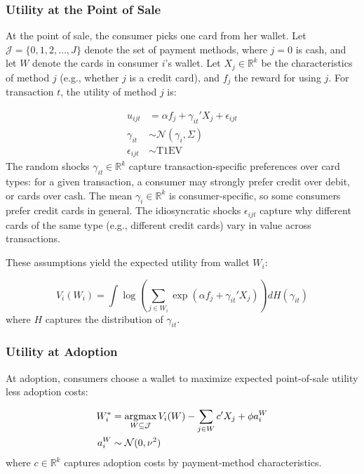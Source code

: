 \documentclass[main.tex]{subfiles}
\begin{document}
\subsubsection{Utility at the Point of Sale}

At the point of sale, the consumer picks one card from her wallet. Let $\mathcal{J} = \{0, 1, 2, \ldots, J\}$ denote the set of payment methods, where $j = 0$ is cash, and let $W$ denote the cards in consumer $i$'s wallet. Let $X_j \in \mathbb{R}^k$ be the characteristics of method $j$ (e.g., whether $j$ is a credit card), and $f_j$ the reward for using $j$.
For transaction $t$, the utility of method $j$ is:

\begin{align*}
u_{ijt} &= \alpha f_j + \gamma_{it}' X_j + \epsilon_{ijt} \\
\gamma_{it} &\sim \mathcal{N}(\gamma_i, \Sigma) \\
\epsilon_{ijt} &\sim \text{T1EV}
\end{align*}
The random shocks $\gamma_{it} \in \mathbb{R}^k$ capture transaction-specific preferences over card types: for a given transaction, a consumer may strongly prefer credit over debit, or cards over cash.
The mean $\gamma_i \in \mathbb{R}^k$ is consumer-specific, so some consumers prefer credit cards in general.
The idiosyncratic shocks $\epsilon_{ijt}$ capture why different cards of the same type (e.g., different credit cards) vary in value across transactions.

These assumptions yield the expected utility from wallet $W_i$:

\[
V_i(W_i) = \int \log\!\left(\sum_{j \in W_i} \exp\!\left(\alpha f_j + \gamma_{it}' X_j\right)\right) dH(\gamma_{it})
\]
where $H$ captures the distribution of $\gamma_{it}$.

\subsubsection{Utility at Adoption}

At adoption, consumers choose a wallet to maximize expected point-of-sale utility less adoption costs:

\begin{align*}
W_i^* &= \argmax_{W \subseteq \mathcal{J}} V_i(W) - \sum_{j \in W} c' X_j + \phi a_i^W \\
a_i^W &\sim \mathcal{N}(0, \nu^2)
\end{align*}
where $c \in \mathbb{R}^k$ captures adoption costs by payment-method characteristics.
\end{document}
